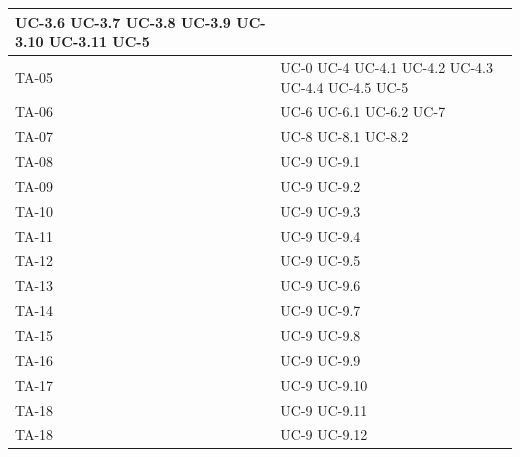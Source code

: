 \documentclass[8pt]{article}
\begin{document}
\begin{longtable}{|>{\centering}p{4cm}|>{\centering\arraybackslash}p{4cm}|}
            UC-3.6 \newline
            UC-3.7 \newline
            UC-3.8 \newline
            UC-3.9 \newline
            UC-3.10 \newline
            UC-3.11 \newline
            UC-5
    \\
    \hline
    TA-05 & UC-0 \newline
            UC-4 \newline 
            UC-4.1 \newline
            UC-4.2 \newline
            UC-4.3 \newline
            UC-4.4 \newline
            UC-4.5 \newline
            UC-5
    \\
    \hline
    TA-06 & UC-6 \newline
            UC-6.1 \newline
            UC-6.2 \newline
            UC-7
    \\
    \hline
    TA-07 & UC-8 \newline
            UC-8.1 \newline
            UC-8.2
    \\
    \hline
    TA-08 & UC-9 \newline
            UC-9.1
    \\
    \hline
    TA-09 & UC-9 \newline
            UC-9.2
    \\
    \hline
    TA-10 & UC-9 \newline
            UC-9.3
    \\
    \hline
    TA-11 & UC-9 \newline
            UC-9.4
    \\
    \hline
    TA-12 & UC-9 \newline
            UC-9.5
    \\
    \hline
    TA-13 & UC-9 \newline
            UC-9.6
    \\
    \hline
    TA-14 & UC-9 \newline
            UC-9.7
    \\
    \hline
    TA-15 & UC-9 \newline
            UC-9.8
    \\
    \hline
    TA-16 & UC-9 \newline
            UC-9.9
    \\
    \hline
    TA-17 & UC-9 \newline
            UC-9.10
    \\
    \hline
    TA-18 & UC-9 \newline
            UC-9.11
    \\
    \hline
    TA-18 & UC-9 \newline
            UC-9.12
    \\
    \hline
\end{longtable}
\clearpage
\end{document}
